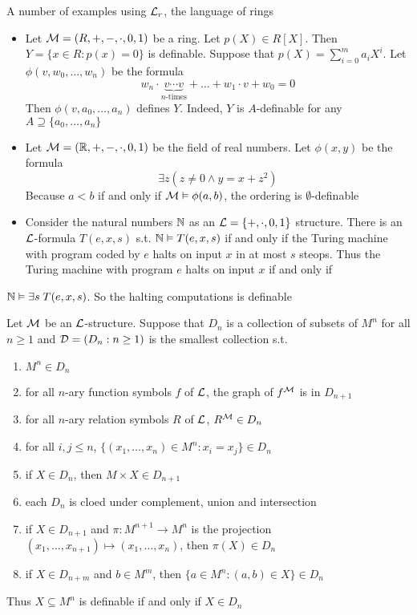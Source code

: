 \documentclass[11pt]{article}
\begin{document}
A number of examples using \(\mathcal{L}_r\), the language of rings
\begin{itemize}
\item Let \(\mathcal{M}=(R,+,-,\cdot,0,1)\) be a ring. Let \(p(X)\in R[X]\). Then 
\(Y=\{x\in R:p(x)=0\}\) is definable. Suppose that
\(p(X)=\displaystyle\sum_{i=0}^ma_iX^i\). Let \(\phi(v,w_0,\dots,w_n)\) be the
formula
\begin{equation*}
w_n\cdot\underbrace{v\cdots v}_{n\text{-times}}+\dots+w_1\cdot v+w_0=0
\end{equation*}
Then \(\phi(v,a_0,\dots,a_n)\) defines \(Y\). Indeed, \(Y\) is \(A\)-definable
for any \(A\supseteq\{a_0,\dots,a_n\}\)
\item Let \(\mathcal{M}=(\mathbb{R},+,-,\cdot,0,1)\) be the field of real numbers. Let
\(\phi(x,y)\) be the formula 
\begin{equation*}
\exists z(z\neq 0\wedge y=x+z^2)
\end{equation*}
Because \(a<b\) if and only if \(\mathcal{M}\vDash\phi(a,b)\), the ordering is
\(\emptyset\)-definable
\item Consider the natural numbers \(\mathbb{N}\) as an \(\mathcal{L}=\{+,\cdot,0,1\}\) structure.
There is an \(\mathcal{L}\)-formula \(T(e,x,s)\) s.t. \(\mathbb{N}\vDash T(e,x,s)\) if and
only if the Turing machine with program coded by \(e\) halts on input \(x\) in
at most \(s\) steops. Thus the Turing machine with program \(e\) halts on input
\(x\) if and only if
\end{itemize}

\(\mathbb{N}\vDash\exists s\;T(e,x,s)\). So the halting
    computations is definable


\begin{proposition}[]
Let \(\mathcal{M}\) be an \(\mathcal{L}\)-structure. Suppose that \(D_n\) is a collection of
subsets of \(M^n\) for all \(n\ge 1\) and \(\mathcal{D}=(D_n:n\ge 1)\) is the smallest
collection s.t. 
\begin{enumerate}
\item \(M^n\in D_n\)
\item for all \(n\)-ary function symbols \(f\) of \(\mathcal{L}\), the graph of \(f^{\mathcal{M}}\)
is in \(D_{n+1}\)
\item for all \(n\)-ary relation symbols \(R\) of \(\mathcal{L}\), \(R^{\mathcal{M}}\in D_n\)
\item for all \(i,j\le n\), \(\{(x_1,\dots,x_n)\in M^n:x_i=x_j\}\in D_n\)
\item if \(X\in D_n\), then \(M\times X\in D_{n+1}\)
\item each \(D_n\) is cloed under complement, union and intersection
\item if \(X\in D_{n+1}\) and \(\pi:M^{n+1}\to M^n\) is the projection 
\((x_1,\dots,x_{n+1})\mapsto(x_1,\dots,x_n)\), then \(\pi(X)\in D_n\)
\item if \(X\in D_{n+m}\) and \(b\in M^m\), then \(\{a\in M^n:(a,b)\in X\}\in D_n\)
\end{enumerate}


Thus \(X\subseteq M^n\) is definable if and only if \(X\in D_n\)
\end{proposition}
\end{document}
